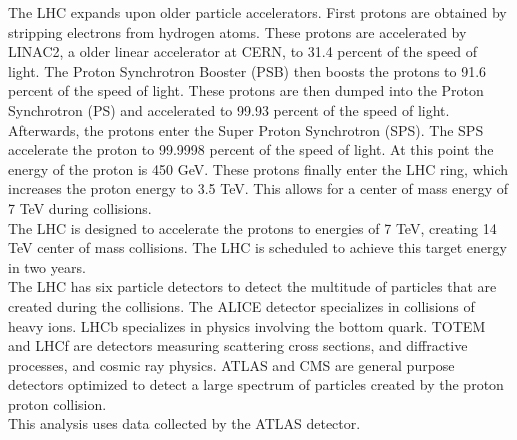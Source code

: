 \indent The LHC expands upon older particle accelerators. First protons are obtained by stripping electrons from hydrogen atoms. These protons are accelerated by LINAC2, a older linear accelerator at CERN, to 31.4 percent of the speed of light. The Proton Synchrotron Booster (PSB) then boosts the protons to 91.6 percent of the speed of light. These protons are then dumped into the Proton Synchrotron (PS) and accelerated to 99.93 percent of the speed of light. Afterwards, the protons enter the Super Proton Synchrotron (SPS). The SPS accelerate the proton to 99.9998 percent of the speed of light. At this point the energy of the proton is 450 GeV. These protons finally enter the LHC ring, which increases the proton energy to 3.5 TeV. This allows for a center of mass energy of 7 TeV during collisions. ~\\
\indent The LHC is designed to accelerate the protons to energies of 7 TeV, creating 14 TeV center of mass collisions. The LHC is scheduled to achieve this target energy in two years. ~\\
\indent The LHC has six particle detectors to detect the multitude of particles that are created during the collisions. The ALICE detector specializes in collisions of heavy ions. LHCb specializes in physics involving the bottom quark. TOTEM and LHCf are detectors measuring scattering cross sections, and diffractive processes, and cosmic ray physics. ATLAS and CMS are general purpose detectors optimized to detect a large spectrum of particles created by the proton proton collision. ~\\
\indent This analysis uses data collected by the ATLAS detector. ~\\
